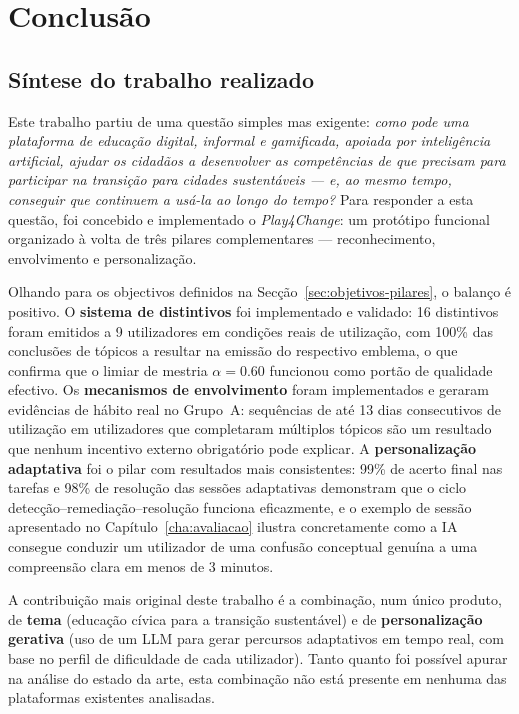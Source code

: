 %
%
\chapter{Conclusão}
\label{cha:conclusao}

\section{Síntese do trabalho realizado}
\label{sec:sintese-trabalho}

Este trabalho partiu de uma questão simples mas exigente: \emph{como pode uma plataforma de educação digital, informal e gamificada, apoiada por inteligência artificial, ajudar os cidadãos a desenvolver as competências de que precisam para participar na transição para cidades sustentáveis --- e, ao mesmo tempo, conseguir que continuem a usá-la ao longo do tempo?} Para responder a esta questão, foi concebido e implementado o \emph{Play4Change}: um protótipo funcional organizado à volta de três pilares complementares --- reconhecimento, envolvimento e personalização.

Olhando para os objectivos definidos na Secção~\ref{sec:objetivos-pilares}, o balanço é positivo. O \textbf{sistema de distintivos} foi implementado e validado: 16 distintivos foram emitidos a 9 utilizadores em condições reais de utilização, com 100\% das conclusões de tópicos a resultar na emissão do respectivo emblema, o que confirma que o limiar de mestria $\alpha = 0.60$ funcionou como portão de qualidade efectivo. Os \textbf{mecanismos de envolvimento} foram implementados e geraram evidências de hábito real no Grupo~A: sequências de até 13 dias consecutivos de utilização em utilizadores que completaram múltiplos tópicos são um resultado que nenhum incentivo externo obrigatório pode explicar. A \textbf{personalização adaptativa} foi o pilar com resultados mais consistentes: 99\% de acerto final nas tarefas e 98\% de resolução das sessões adaptativas demonstram que o ciclo detecção--remediação--resolução funciona eficazmente, e o exemplo de sessão apresentado no Capítulo~\ref{cha:avaliacao} ilustra concretamente como a IA consegue conduzir um utilizador de uma confusão conceptual genuína a uma compreensão clara em menos de 3 minutos.

A contribuição mais original deste trabalho é a combinação, num único produto, de \textbf{tema} (educação cívica para a transição sustentável) e de \textbf{personalização gerativa} (uso de um LLM para gerar percursos adaptativos em tempo real, com base no perfil de dificuldade de cada utilizador). Tanto quanto foi possível apurar na análise do estado da arte, esta combinação não está presente em nenhuma das plataformas existentes analisadas.

